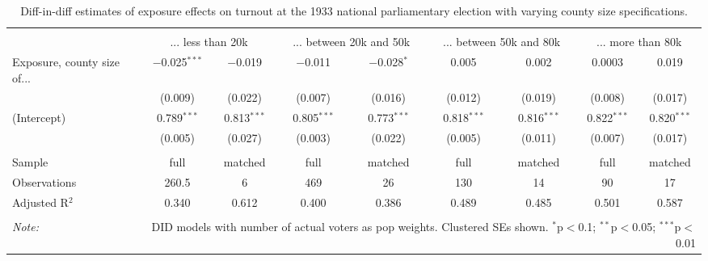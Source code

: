 
\begin{table}[!htbp] \centering 
  \caption{Diff-in-diff estimates of exposure effects on turnout at the 1933 national parliamentary election with varying county size specifications.\vspace{-.25cm}} 
  \label{tab:turnout-countysize-dd-1933} 
\scriptsize 
\begin{tabular}{@{\extracolsep{5pt}}lcccccccc} 
\\[-1.8ex]\hline 
\hline \\[-1.8ex] 
 & \multicolumn{2}{c}{... less than 20k } & \multicolumn{2}{c}{... between 20k and 50k} & \multicolumn{2}{c}{... between 50k and 80k} & \multicolumn{2}{c}{... more than 80k} \\ 
 \cmidrule(r){2-3}\cmidrule(r){4-5}\cmidrule(r){6-7}\cmidrule(r){8-9}Exposure, county size of... & $-$0.025$^{***}$ & $-$0.019 & $-$0.011 & $-$0.028$^{*}$ & 0.005 & 0.002 & 0.0003 & 0.019 \\ 
  & (0.009) & (0.022) & (0.007) & (0.016) & (0.012) & (0.019) & (0.008) & (0.017) \\ 
  (Intercept) & 0.789$^{***}$ & 0.813$^{***}$ & 0.805$^{***}$ & 0.773$^{***}$ & 0.818$^{***}$ & 0.816$^{***}$ & 0.822$^{***}$ & 0.820$^{***}$ \\ 
  & (0.005) & (0.027) & (0.003) & (0.022) & (0.005) & (0.011) & (0.007) & (0.017) \\ 
 \hline \\[-1.8ex] 
Sample & full & matched & full & matched & full & matched & full & matched \\ 
Observations & 260.5 & 6 & 469 & 26 & 130 & 14 & 90 & 17 \\ 
Adjusted R$^{2}$ & 0.340 & 0.612 & 0.400 & 0.386 & 0.489 & 0.485 & 0.501 & 0.587 \\ 
\hline 
\hline \\[-1.8ex] 
\textit{Note:}  & \multicolumn{8}{r}{DID models with number of actual voters as pop weights. Clustered SEs shown. $^{*}$p$<$0.1; $^{**}$p$<$0.05; $^{***}$p$<$0.01} \\ 
\end{tabular} 
\end{table} 
